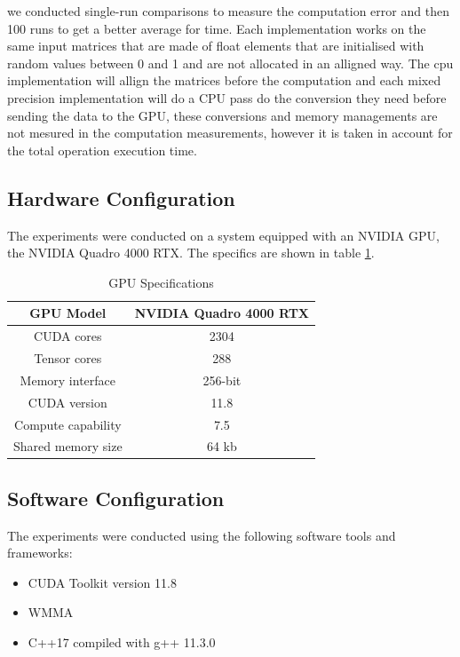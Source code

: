 \documentclass[conference]{IEEEtran}
\begin{document}
  we conducted single-run comparisons to measure the computation error and then 100 runs to get a better average for time.
  Each implementation works on the same input matrices that are made of float elements that are initialised with random values between 0 and 1
  and are not allocated in an alligned way. The cpu implementation will allign the matrices before the computation and each mixed precision implementation will do a CPU pass do the conversion they need
  before sending the data to the GPU, these conversions and memory managements are not mesured in the computation 
  measurements, however it is taken in account for the total operation execution time.

  \subsection{Hardware Configuration}\label{sec:hardware-configuration}
  
  The experiments were conducted on a system equipped with an NVIDIA GPU, the NVIDIA Quadro 4000 RTX.
  The specifics are shown in table \ref{GPU}.
  
  \begin{table}[htbp]
  \caption{GPU Specifications\cite{Voltatuningguide}}
  \centering
  \label{GPU}
    \begin{tabular}{|c|c|}
    \hline
    GPU Model & NVIDIA Quadro 4000 RTX \\
    \hline
    CUDA cores & 2304 \\
    \hline
    Tensor cores & 288 \\
    \hline
    Memory interface & 256-bit \\
    \hline
    CUDA version & 11.8 \\
    \hline
    Compute capability & 7.5 \\
    \hline
    Shared memory size & 64 kb \\
    \hline
    
  \end{tabular}
  \end{table}
  
  \subsection{Software Configuration}\label{sec:software-configuration}
  
  The experiments were conducted using the following software tools and frameworks:
  
  \begin{itemize}
    \item CUDA Toolkit version 11.8
    \item WMMA
    \item C++17 compiled with g++ 11.3.0
  \end{itemize}
\end{document}
